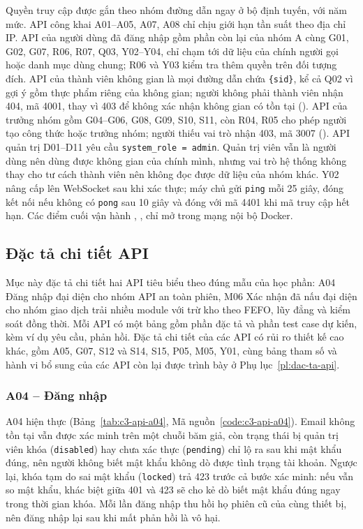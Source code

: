 Quyền truy cập được gắn theo nhóm đường dẫn ngay ở bộ định tuyến, với năm mức. API công khai A01--A05, A07, A08 chỉ chịu giới hạn tần suất theo địa chỉ IP. API của người dùng đã đăng nhập gồm phần còn lại của nhóm A cùng G01, G02, G07, R06, R07, Q03, Y02--Y04, chỉ chạm tới dữ liệu của chính người gọi hoặc danh mục dùng chung; R06 và Y03 kiểm tra thêm quyền trên đối tượng đích. API của thành viên không gian là mọi đường dẫn chứa \texttt{\{sid\}}, kể cả Q02 vì gợi ý gồm thực phẩm riêng của không gian; người không phải thành viên nhận 404, mã 4001, thay vì 403 để không xác nhận không gian có tồn tại (). API của trưởng nhóm gồm G04--G06, G08, G09, S10, S11, còn R04, R05 cho phép người tạo công thức hoặc trưởng nhóm; người thiếu vai trò nhận 403, mã 3007 (). API quản trị D01--D11 yêu cầu \texttt{system\_role = admin}. Quản trị viên vẫn là người dùng nên dùng được không gian của chính mình, nhưng vai trò hệ thống không thay cho tư cách thành viên nên không đọc được dữ liệu của nhóm khác. Y02 nâng cấp lên WebSocket sau khi xác thực; máy chủ gửi \texttt{ping} mỗi 25 giây, đóng kết nối nếu không có \texttt{pong} sau 10 giây và đóng với mã 4401 khi mã truy cập hết hạn. Các điểm cuối vận hành , ,  chỉ mở trong mạng nội bộ Docker.


\subsection{Đặc tả chi tiết API}\label{ssec:dac-ta-api}

Mục này đặc tả chi tiết hai API tiêu biểu theo đúng mẫu của học phần: A04 Đăng nhập đại diện cho nhóm API an toàn phiên, M06 Xác nhận đã nấu đại diện cho nhóm giao dịch trải nhiều module với trừ kho theo FEFO, lũy đẳng và kiểm soát đồng thời. Mỗi API có một bảng gồm phần đặc tả và phần test case dự kiến, kèm ví dụ yêu cầu, phản hồi. Đặc tả chi tiết của các API có rủi ro thiết kế cao khác, gồm A05, G07, S12 và S14, S15, P05, M05, Y01, cùng bảng tham số và hành vi bổ sung của các API còn lại được trình bày ở Phụ lục~\ref{pl:dac-ta-api}.

\subsubsection{A04 – Đăng nhập}\label{sssec:api-a04}

A04 hiện thực  (Bảng~\ref{tab:c3-api-a04}, Mã nguồn~\ref{code:c3-api-a04}). Email không tồn tại vẫn được xác minh trên một chuỗi băm giả, còn trạng thái bị quản trị viên khóa (\texttt{disabled}) hay chưa xác thực (\texttt{pending}) chỉ lộ ra sau khi mật khẩu đúng, nên người không biết mật khẩu không dò được tình trạng tài khoản. Ngược lại, khóa tạm do sai mật khẩu (\texttt{locked}) trả 423 trước cả bước xác minh: nếu vẫn so mật khẩu, khác biệt giữa 401 và 423 sẽ cho kẻ dò biết mật khẩu đúng ngay trong thời gian khóa. Mỗi lần đăng nhập thu hồi họ phiên cũ của cùng thiết bị, nên đăng nhập lại sau khi mất phản hồi là vô hại.

